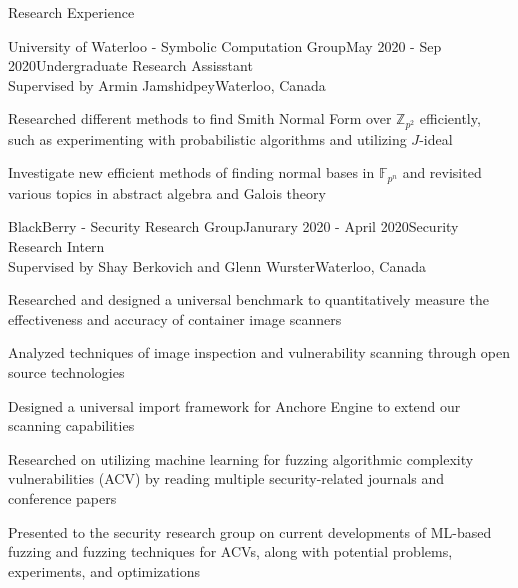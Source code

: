 \documentclass{cv}
\begin{document}
\begin{rSection}{Research Experience}
\begin{rSubsection}{University of Waterloo - Symbolic Computation Group}{May 2020 - Sep 2020}{Undergraduate Research Assisstant \\ Supervised by Armin Jamshidpey}{Waterloo, Canada}
  	\item Researched different methods to find Smith Normal Form over $\mathbb{Z}_{p^2}$ efficiently, such as experimenting with probabilistic algorithms and utilizing $J$-ideal
  	\item Investigate new efficient methods of finding normal bases in $\mathbb{F}_{p^n}$ and revisited various topics in abstract algebra and Galois theory
\end{rSubsection}

\begin{rSubsection}{BlackBerry - Security Research Group}{Janurary 2020 - April 2020}{Security Research Intern \\ Supervised by Shay Berkovich and Glenn Wurster}{Waterloo, Canada}
	\item Researched and designed a universal benchmark to quantitatively measure the effectiveness and accuracy of container image scanners
	\item Analyzed techniques of image inspection and vulnerability scanning through open source technologies
	\item Designed a universal import framework for Anchore Engine to extend our scanning capabilities
	\item Researched on utilizing machine learning for fuzzing algorithmic complexity vulnerabilities (ACV) by reading multiple security-related journals and conference papers
	\item Presented to the security research group on current developments of ML-based fuzzing and fuzzing techniques for ACVs, along with potential problems, experiments, and optimizations
\end{rSubsection}
\end{rSection}
\end{document}

